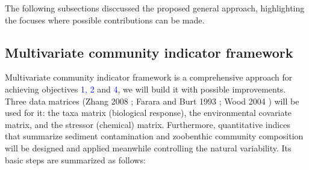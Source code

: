 The following subsections disccussed the proposed general approach, highlighting the focuses where possible contributions
can be made.

\subsection{Multivariate community indicator framework}

Multivariate community indicator framework is a comprehensive approach for achieving objectives \textcolor{blue}{1, 2} and \textcolor{blue}{4}, 
we will build it with possible improvements.
Three data matrices (Zhang 2008 \cite{Zhang2008}; Farara and Burt 1993 \cite{Farara1993}; Wood 2004 \cite{Wood2004}) will be used for it:
the taxa matrix (biological response), the environmental covariate matrix, and the stressor (chemical) matrix.
Furthermore, quantitative indices that summarize sediment contamination and zoobenthic community composition
will be designed and applied meanwhile controlling the natural variability. 
Its basic steps are summarized as follows:

